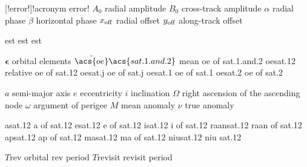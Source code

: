 \begin{acronym}[---------------]
%
[!error!]{!acronym error!}
%
        {$A_0$}          {radial amplitude}
        {$B_0$}          {cross-track amplitude}
      {$\alpha$}      {radial phase}
      {$\beta$}        {horizontal phase}
      {$x_{\rm off}$}  {radial offset}
      {$y_{\rm off}$}  {along-track offset}

 				{est}
 				{est}
			{est}

				{${\bm{\epsilon}}$}			{orbital elements}
		{$\bar{\acs{oe}}\acs{sat.1.and.2}$}
																										{mean \acl{oe} of \acl{sat.1.and.2}}
 		{\acs{oe}\acs{sat.12}}	{relative \acl{oe} of \acl{sat.12}}
			{\acs{oe}\acs{sat.j}}		{\acl{oe} of \acl{sat.j}}
			{\acs{oe}\acs{sat.1}}		{\acl{oe} of \acl{sat.1}}
			{\acs{oe}\acs{sat.2}}		{\acl{oe} of \acl{sat.2}}

					{$a$}					{semi-major axis}
					{$e$}					{eccentricity}
					{$i$}					{inclination}
			{$\Omega$}		{right ascension of the ascending node}
				{$\omega$}		{argument of perigee}
				{$M$}					{mean anomaly}
 			{$\nu$}				{true anomaly}

			{\acs{a}\acs{sat.12}}			{\acl{a} of \acl{sat.12}}
			{\acs{e}\acs{sat.12}}			{\acl{e} of \acl{sat.12}}
			{\acs{i}\acs{sat.12}}			{\acl{i} of \acl{sat.12}}
	{\acs{raan}\acs{sat.12}}	{\acl{raan} of \acl{sat.12}}
		{\acs{ap}\acs{sat.12}}		{\acl{ap} of \acl{sat.12}}
		{\acs{ma}\acs{sat.12}}		{\acl{ma} of \acl{sat.12}}
		{\acs{niu}\acs{sat.12}}		{\acl{niu} \acl{sat.12}}

			{$T$\acs{rev}}						{orbital \acl{rev} period}
	{$T$\acs{revisit}}				{\acl{revisit} period}

\newcommand*{\acromatrix}[3]{
	\acrosympluralni{#1}{#2}{#3 matrix}{#2}{#3 matrices}
}


\end{acronym}
